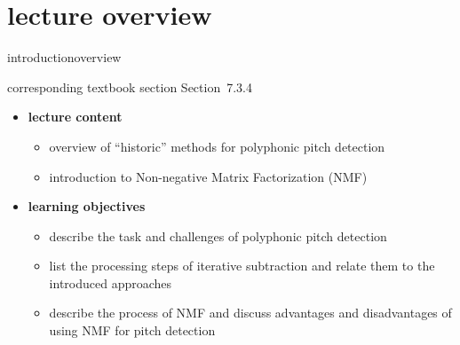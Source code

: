 


\subtitle{Module 7.3.4: Fundamental Frequency Detection in Polyphonic Signals}


	

    \section[overview]{lecture overview}
        \begin{frame}{introduction}{overview}
            \begin{block}{corresponding textbook section}
                    Section~7.3.4
            \end{block}

            \begin{itemize}
                \item   \textbf{lecture content}
                    \begin{itemize}
                        \item   overview of ``historic'' methods for polyphonic pitch detection
                        \item   introduction to Non-negative Matrix Factorization (NMF)
                    \end{itemize}
                \bigskip
                \item<2->   \textbf{learning objectives}
                    \begin{itemize}
                        \item   describe the task and challenges of polyphonic pitch detection
                        \item   list the processing steps of iterative subtraction and relate them to the introduced approaches
                        \item   describe the process of NMF and discuss advantages and disadvantages of using NMF for pitch detection
                    \end{itemize}
            \end{itemize}
        \end{frame}

